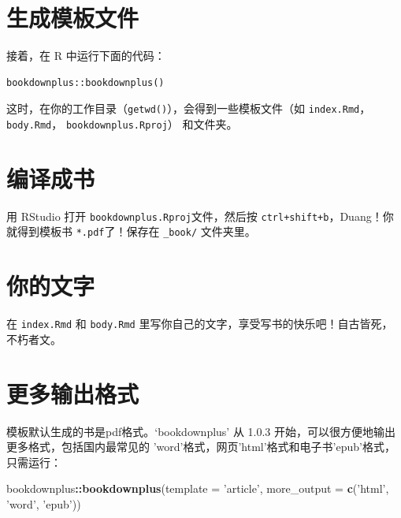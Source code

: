\documentclass[UTF8, openany]{pkuthss}
\newenvironment{Shaded}{\begin{snugshade}}{\end{snugshade}}
\newcommand{\KeywordTok}[1]{\textcolor[rgb]{0.13,0.29,0.53}{\textbf{{#1}}}}
\newcommand{\DataTypeTok}[1]{\textcolor[rgb]{0.13,0.29,0.53}{{#1}}}
\newcommand{\StringTok}[1]{\textcolor[rgb]{0.31,0.60,0.02}{{#1}}}
\newcommand{\OperatorTok}[1]{\textcolor[rgb]{0.81,0.36,0.00}{\textbf{{#1}}}}
\newcommand{\NormalTok}[1]{{#1}}
\begin{document}
\hypertarget{section-2}{%
\section{生成模板文件}\label{section-2}}

接着，在 R 中运行下面的代码：

\begin{verbatim}
bookdownplus::bookdownplus()
\end{verbatim}

这时，在你的工作目录（\texttt{getwd()}），会得到一些模板文件（如 \texttt{index.Rmd}，\texttt{body.Rmd}， \texttt{bookdownplus.Rproj}） 和文件夹。

\hypertarget{section-3}{%
\section{编译成书}\label{section-3}}

用 RStudio 打开 \texttt{bookdownplus.Rproj}文件，然后按 \texttt{ctrl+shift+b}，Duang！你就得到模板书 \texttt{*.pdf}了！保存在 \texttt{\_book/} 文件夹里。

\hypertarget{section-4}{%
\section{你的文字}\label{section-4}}

在 \texttt{index.Rmd} 和 \texttt{body.Rmd} 里写你自己的文字，享受写书的快乐吧！自古皆死，不朽者文。

\hypertarget{section-5}{%
\section{更多输出格式}\label{section-5}}

模板默认生成的书是pdf格式。`bookdownplus' 从 1.0.3 开始，可以很方便地输出更多格式，包括国内最常见的 'word'格式，网页'html'格式和电子书'epub'格式，只需运行：

\begin{Shaded}
\begin{Highlighting}[]
\NormalTok{bookdownplus}\OperatorTok{::}\KeywordTok{bookdownplus}\NormalTok{(}\DataTypeTok{template =} \StringTok{'article'}\NormalTok{, }
    \DataTypeTok{more_output =} \KeywordTok{c}\NormalTok{(}\StringTok{'html'}\NormalTok{, }\StringTok{'word'}\NormalTok{, }\StringTok{'epub'}\NormalTok{))}
\end{Highlighting}
\end{Shaded}
\end{document}
